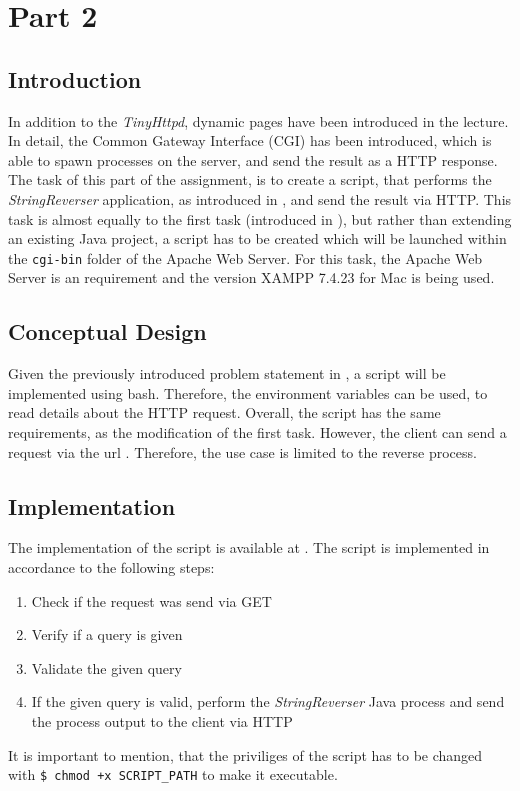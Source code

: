 \section{Part 2}\label{sec:02_part2}

\subsection{Introduction}\label{subsec:02_part2_intro}
In addition to the \textit{TinyHttpd}, dynamic pages have been introduced in the lecture. In detail, the Common Gateway Interface (CGI) has been introduced, which is able to spawn processes on the server, and send the result as a HTTP response.
The task of this part of the assignment, is to create a script, that performs the \textit{StringReverser} application, as introduced in , and send the result via HTTP. This task is almost equally to the first task (introduced in ), but rather than extending an existing Java project, a script has to be created which will be launched within the \texttt{cgi-bin} folder of the Apache Web Server.
For this task, the Apache Web Server is an requirement and the version XAMPP 7.4.23 for Mac is being used. 

\subsection{Conceptual Design}\label{subsec:02_part2_design}
Given the previously introduced problem statement in , a script will be implemented using bash. Therefore, the environment variables can be used, to read details about the HTTP request.
Overall, the script has the same requirements, as the modification of the first task. However, the client can send a request via the url . Therefore, the use case is limited to the reverse process.

\subsection{Implementation}\label{subsec:02_part2_impl}
The implementation of the script is available at .
The script is implemented in accordance to the following steps:
\begin{enumerate}
\item Check if the request was send via GET
\item Verify if a query is given
\item Validate the given query
\item If the given query is valid, perform the \textit{StringReverser} Java process and send the process output to the client via HTTP
\end{enumerate}
It is important to mention, that the priviliges of the script has to be changed with \texttt{\$ chmod +x SCRIPT\_PATH} to make it executable.


